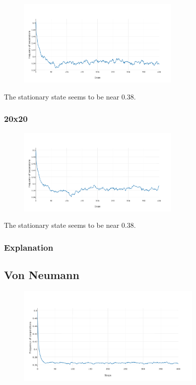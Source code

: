 \documentclass[11pt]{article}
\begin{document}
\begin{figure}[H]
\centering
   \includegraphics[width=0.7\textwidth]{img/part2/part2-moore-12-12.png}
\end{figure}
The stationary state seems to be near $0.38$. 

\subsubsection{20x20}

\begin{figure}[H]
\centering
   \includegraphics[width=0.7\textwidth]{img/part2/part2-moore-20-20.png}
\end{figure}

The stationary state seems to be near $0.38$. 

\subsubsection{Explanation}


\subsection{Von Neumann}

\begin{figure}[H]
\centering
   \includegraphics[width=0.8\textwidth]{img/part2/part2-vonn-notmyself.png}
\end{figure}
\end{document}
